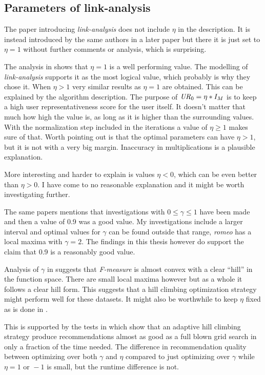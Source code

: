 \subsection{Parameters of link-analysis}

The paper introducing \textit{link-analysis} \cite{huang2004link} does not include $\eta$ in the description. It is instead introduced by the same authors in a later paper \cite{huang2007comparison} but there it is just set to $\eta = 1$ without further comments or analysis, which is surprising.

The analysis in  shows that $\eta = 1$ is a well performing value. The modelling of \textit{link-analysis} supports it as the most logical value, which probably is why they chose it. When $\eta > 1$ very similar results as $\eta = 1$ are obtained. This can be explained by the algorithm description. The purpose of $\mathit{UR}_0 = \eta * I_M$ is to keep a high user representativeness score for the user itself. It doesn't matter that much how high the value is, as long as it is higher than the surrounding values. With the normalization step included in the iterations a value of $\eta \geq 1$ makes sure of that. Worth pointing out is that the optimal parameters can have $\eta > 1$, but it is not with a very big margin. Inaccuracy in multiplications is a plausible explanation.

More interesting and harder to explain is values $\eta < 0$, which can be even better than $\eta > 0$. I have come to no reasonable explanation and it might be worth investigating further.

The same papers \cite{huang2004link, huang2007comparison} mentions that investigations with $0 \leq \gamma \leq 1$ have been made and then a value of 0.9 was a good value. My investigations include a larger interval and optimal values for $\gamma$ can be found outside that range, \textit{romeo} has a local maxima with $\gamma = 2$. The findings in this thesis however do support the claim that 0.9 is a reasonably good value.

Analysis of $\gamma$ in  suggests that \textit{F-measure} is almost convex with a clear ``hill'' in the function space. There are small local maxima however but as a whole it follows a clear hill form. This suggests that a hill climbing optimization strategy might perform well for these datasets. It might also be worthwhile to keep $\eta$ fixed as is done in \cite{huang2004link, huang2007comparison}.

This is supported by the tests in  which show that an adaptive hill climbing strategy produce recommendations almost as good as a full blown grid search in only a fraction of the time needed. The difference in recommendation quality between optimizing over both $\gamma$ and $\eta$ compared to just optimizing over $\gamma$ while $\eta = 1 \text{ or } -1$ is small, but the runtime difference is not.

